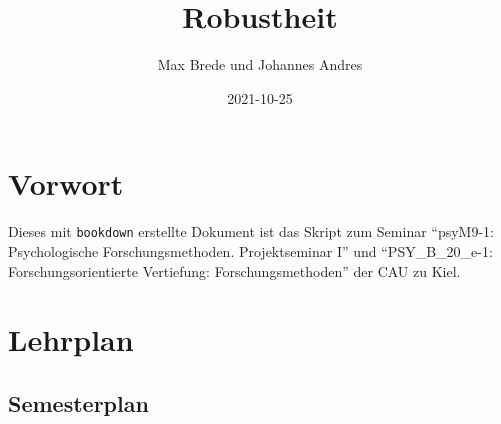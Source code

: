\documentclass[
]{book}
\title{Robustheit}
\author{Max Brede und Johannes Andres}
\date{2021-10-25}
\begin{document}
\maketitle

{
\setcounter{tocdepth}{1}
\tableofcontents
}
\hypertarget{vorwort}{%
\chapter{Vorwort}\label{vorwort}}

Dieses mit \texttt{bookdown} erstellte Dokument ist das Skript zum Seminar ``psyM9-1: Psychologische Forschungsmethoden. Projektseminar I'' und ``PSY\_B\_20\_e-1: Forschungsorientierte Vertiefung: Forschungsmethoden'' der CAU zu Kiel.

\hypertarget{lehrplan}{%
\chapter{Lehrplan}\label{lehrplan}}

\hypertarget{semesterplan}{%
\section{Semesterplan}\label{semesterplan}}

\scriptsize
\end{document}
